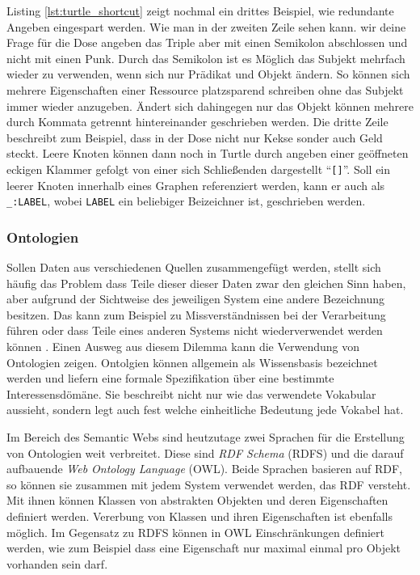Listing \ref{lst:turtle_shortcut} zeigt nochmal ein drittes Beispiel, wie redundante Angeben eingespart werden. Wie man in der zweiten Zeile sehen kann. wir deine Frage für die Dose angeben das Triple aber mit einen Semikolon abschlossen und nicht mit einen Punk. Durch das Semikolon ist es Möglich das Subjekt mehrfach wieder zu verwenden, wenn sich nur Prädikat und Objekt ändern. So können sich mehrere Eigenschaften einer Ressource platzsparend schreiben ohne das Subjekt immer wieder anzugeben. Ändert sich dahingegen nur das Objekt können mehrere durch Kommata getrennt hintereinander geschrieben werden. Die dritte Zeile beschreibt zum Beispiel, dass in der Dose nicht nur Kekse sonder auch Geld steckt. Leere Knoten können dann noch in Turtle durch angeben einer geöffneten eckigen Klammer gefolgt von einer sich Schließenden dargestellt \enquote{\texttt{[]}}. Soll ein leerer Knoten innerhalb eines Graphen referenziert werden, kann er auch als \texttt{\_:LABEL}, wobei \texttt{LABEL} ein beliebiger Beizeichner ist, geschrieben werden.



\subsubsection{Ontologien} %
\label{ssub:ontologien}

Sollen Daten aus verschiedenen Quellen zusammengefügt werden, stellt sich häufig das Problem dass Teile dieser dieser Daten zwar den gleichen Sinn haben, aber aufgrund der Sichtweise des jeweiligen System eine andere Bezeichnung besitzen. Das kann zum Beispiel zu Missverständnissen bei der Verarbeitung führen oder dass Teile eines anderen Systems nicht wiederverwendet werden können \cite{Uschold1996}. Einen Ausweg aus diesem Dilemma kann die Verwendung von Ontologien zeigen. Ontolgien können allgemein als Wissensbasis \cite{Uschold1996,Hitzler2008a} bezeichnet werden und liefern eine formale Spezifikation über eine bestimmte Interessensdömäne. Sie beschreibt nicht nur wie das verwendete Vokabular aussieht, sondern legt auch fest welche einheitliche Bedeutung jede Vokabel hat. 

\medskip

Im Bereich des Semantic Webs sind heutzutage zwei Sprachen für die Erstellung von Ontologien weit verbreitet. Diese sind \emph{RDF Schema} (RDFS)\cite{Brickley} und die darauf aufbauende \emph{Web Ontology Language} (OWL)\cite{partelschneider2004}. Beide Sprachen basieren auf RDF, so können sie zusammen mit jedem System verwendet werden, das RDF versteht. Mit ihnen können Klassen von abstrakten Objekten und deren Eigenschaften definiert werden. Vererbung von Klassen und ihren Eigenschaften ist ebenfalls möglich. Im Gegensatz zu RDFS können in OWL Einschränkungen definiert werden, wie zum Beispiel dass eine Eigenschaft nur maximal einmal pro Objekt vorhanden sein darf. 

